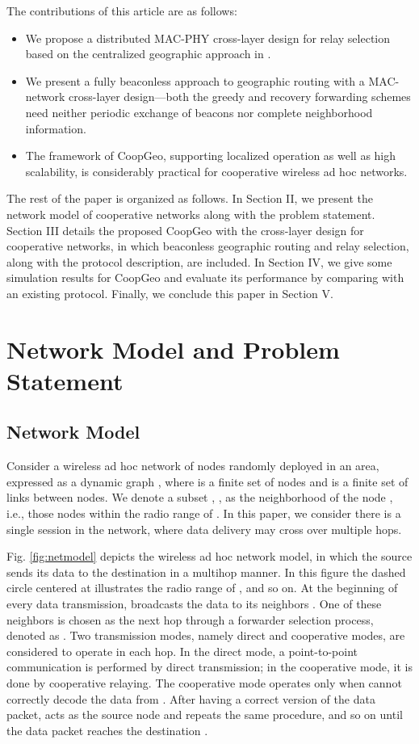 \documentclass[journal,twoside,final]{IEEEtran}
\begin{document}
The contributions of this article are as follows:
\begin{itemize}
  \item We propose a distributed MAC-PHY cross-layer design for relay selection based on the centralized geographic approach in \cite{syue09}. \item We present a fully beaconless approach to geographic routing with a MAC-network cross-layer design---both the greedy and recovery forwarding schemes need neither periodic exchange of beacons nor complete neighborhood information.
\item The framework of CoopGeo, supporting localized operation as well as high scalability, is considerably practical for cooperative wireless ad hoc networks.
\end{itemize}



The rest of the paper is organized as follows. In Section II, we present the network model of cooperative networks along with the problem statement. Section III details the proposed CoopGeo with the cross-layer design for cooperative networks, in which beaconless geographic routing and relay selection, along with the protocol description, are included. In Section IV, we give some simulation results for CoopGeo and evaluate its performance by comparing with an existing protocol. Finally, we conclude this paper in Section V.

\section{Network Model and Problem Statement}
\subsection{Network Model} \label{Subsec:NetModel}
Consider a wireless ad hoc network of  nodes randomly deployed in an area, expressed as a dynamic graph , where  is a finite set of nodes and  is a finite set of links between nodes. We denote a subset , , as the neighborhood of the node , i.e., those nodes within the radio range of . In this paper, we consider there is a single session in the network, where data delivery may cross over multiple hops.

Fig. \ref{fig:netmodel} depicts the wireless ad hoc network model, in which the source  sends its data to the destination  in a multihop manner. In this figure the dashed circle centered at  illustrates the radio range of , and so on. At the beginning of every data transmission,  broadcasts the data to its neighbors . One of these neighbors  is chosen as the next hop through a forwarder selection process, denoted as . Two transmission modes, namely direct and cooperative modes, are considered to operate in each hop. In the direct mode, a point-to-point communication is performed by direct transmission; in the cooperative mode, it is done by cooperative relaying. The cooperative mode operates only when  cannot correctly decode the data from . After having a correct version of the data packet,  acts as the source node and repeats the same procedure, and so on until the data packet reaches the destination .
\end{document}
